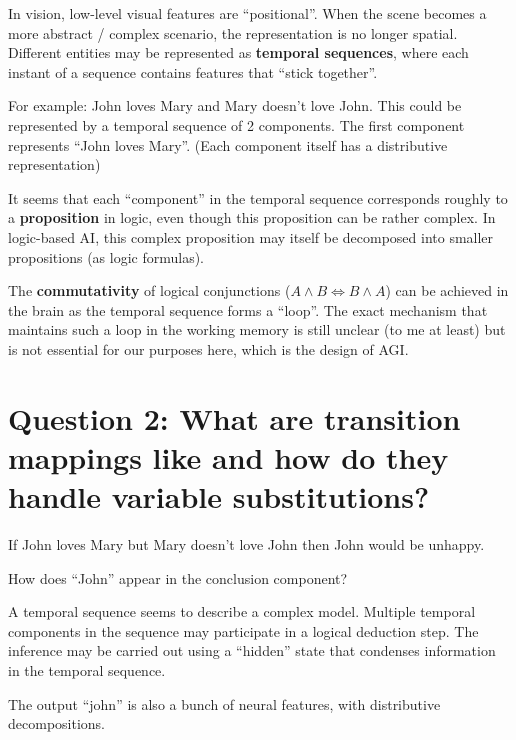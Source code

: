 In vision, low-level visual features are ``positional''.  When the scene becomes a more abstract / complex scenario, the representation is no longer spatial.  Different entities may be represented as \textbf{temporal sequences}, where each instant of a sequence contains features that ``stick together''.

For example:  John loves Mary and Mary doesn't love John.  This could be represented by a temporal sequence of 2 components.  The first component represents ``John loves Mary''.  (Each component itself has a distributive representation)

It seems that each ``component'' in the temporal sequence corresponds roughly to a \textbf{proposition} in logic, even though this proposition can be rather complex.  In logic-based AI, this complex proposition may itself be decomposed into smaller propositions (as logic formulas).

The \textbf{commutativity} of logical conjunctions ($A \wedge B \Leftrightarrow B \wedge A$) can be achieved in the brain as the temporal sequence forms a ``loop''.  The exact mechanism that maintains such a loop in the working memory is still unclear (to me at least) but is not essential for our purposes here, which is the design of AGI.

\section{Question 2: What are transition mappings like and how do they handle variable substitutions?}

If John loves Mary but Mary doesn't love John then John would be unhappy.

How does ``John'' appear in the conclusion component?

A temporal sequence seems to describe a complex model.  Multiple temporal components in the sequence may participate in a logical deduction step.  The inference may be carried out using a ``hidden'' state that condenses information in the temporal sequence.

The output ``john'' is also a bunch of neural features, with distributive decompositions.

